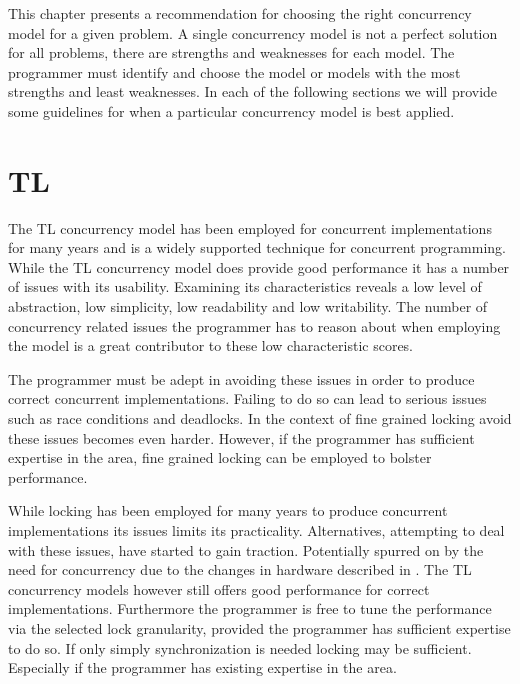 \makeatletter {}\makeatother
{}
This chapter presents a recommendation for choosing the right concurrency model for a given problem. A single concurrency model is not a perfect solution for all problems, there are strengths and weaknesses for each model. The programmer must identify and choose the model or models with the most strengths and least weaknesses. In each of the following sections we will provide some guidelines for when a particular concurrency model is best applied.

\label{chap:choosing_con_model}


\section{\acl{TL}}\label{sec:choose_TL}
The \ac{TL} concurrency model has been employed for concurrent implementations for many years and is a widely supported technique for concurrent programming. While the \ac{TL} concurrency model does provide good performance it has a number of issues with its usability. Examining its characteristics reveals a low level of abstraction, low simplicity, low readability and low writability. The number of concurrency related issues the programmer has to reason about when employing the model is a great contributor to these low characteristic scores.

The programmer must be adept in avoiding these issues in order to produce correct concurrent implementations. Failing to do so can lead to serious issues such as race conditions and deadlocks. In the context of fine grained locking avoid these issues becomes even harder. However, if the programmer has sufficient expertise in the area, fine grained locking can be employed to bolster performance.

While locking has been employed for many years to produce concurrent implementations its issues limits its practicality. Alternatives, attempting to deal with these issues, have started to gain traction. Potentially spurred on by the need for concurrency due to the changes in hardware described in . The \ac{TL} concurrency models however still offers good performance for correct implementations. Furthermore the programmer is free to tune the performance via the selected lock granularity, provided the programmer has sufficient expertise to do so. If only simply synchronization is needed locking may be sufficient. Especially if the programmer has existing expertise in the area.

